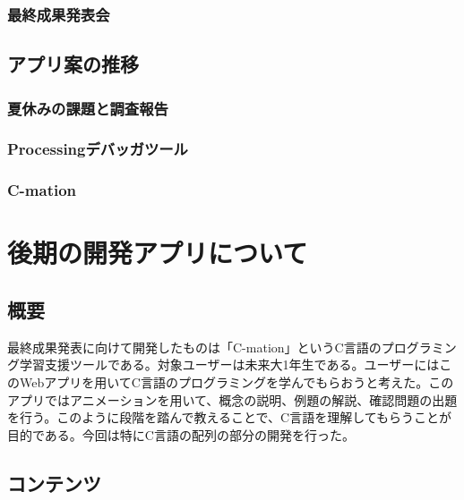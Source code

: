 \documentclass[openany,11pt,papersize]{jsbook}
\begin{document}
\subsection{最終成果発表会}


\section{アプリ案の推移}

\subsection{夏休みの課題と調査報告}

\subsection{Processingデバッガツール}

\subsection{C-mation}



\chapter{後期の開発アプリについて}

\section{概要}
最終成果発表に向けて開発したものは「C-mation」というC言語のプログラミング学習支援ツールである。対象ユーザーは未来大1年生である。ユーザーにはこのWebアプリを用いてC言語のプログラミングを学んでもらおうと考えた。このアプリではアニメーションを用いて、概念の説明、例題の解説、確認問題の出題を行う。このように段階を踏んで教えることで、C言語を理解してもらうことが目的である。今回は特にC言語の配列の部分の開発を行った。

\section{コンテンツ}
\end{document}

